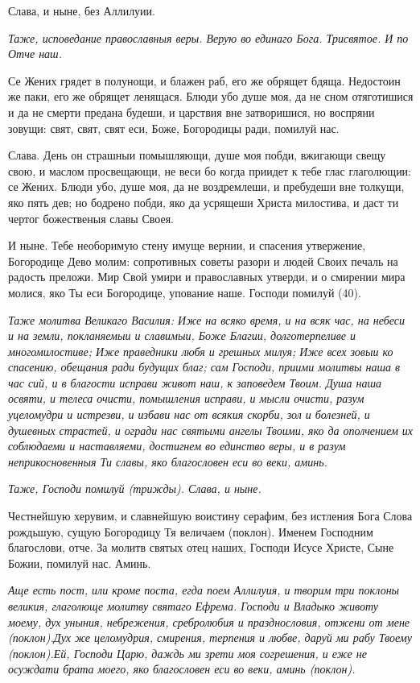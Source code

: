 Слава, и ныне, без Аллилуии. 

\itshape Таже, исповедание православныя веры.\normalfont{} Верую во единаго Бога. Трисвятое. И по Отче наш. 




Се Жених грядет в полунощи, и блажен раб, его же обрящет бдяща. Недостоин же паки, его же обрящет ленящася. Блюди убо душе моя, да не сном отяготишися и да не смерти предана будеши, и царствия вне затворишися, но воспряни зовущи: свят, свят, свят еси, Боже, Богородицы ради, помилуй нас. 

Слава. День он страшныи помышляющи, душе моя побди, вжигающи свещу свою, и маслом просвещающи, не веси бо когда приидет к тебе глас глаголющии: се Жених. Блюди убо, душе моя, да не воздремлеши, и пребудеши вне толкущи, яко пять дев; но бодрено побди, яко да усрящеши Христа милостива, и даст ти чертог божественыя славы Своея. 

И ныне. Тебе необоримую стену имуще вернии, и спасения утвержение, Богородице Дево молим: сопротивных советы разори и людей Своих печаль на радость преложи. Мир Свой умири и православных утверди, и о смирении мира молися, яко Ты еси Богородице, упование наше. Господи помилуй (40). 


\medskip\itshape Таже молитва Великаго Василия:\normalfont{} Иже на всяко время, и на всяк час, на небеси и на земли, покланяемыи и славимыи, Боже Благии, долготерпеливе и многомилостиве; Иже праведники любя и грешных милуя; Иже всех зовыи ко спасению, обещания ради будущих благ; сам Господи, приими молитвы наша в час сий, и в благости исправи живот наш, к заповедем Твоим. Душа наша освяти, и телеса очисти, помышления исправи, и мысли очисти, разум уцеломудри и истрезви, и избави нас от всякия скорби, зол и болезней, и душевных страстей, и огради нас святыми ангелы Твоими, яко да ополчением их соблюдаеми и наставляеми, достигнем во единство веры, и в разум неприкосновенныя Ти славы, яко благословен еси во веки, аминь. 

\itshape Таже, Господи помилуй\normalfont{} (трижды). Слава, и ныне. 

Честнейшую херувим, и славнейшую воистину серафим, без истления Бога Слова рождьшую, сущую Богородицу Тя величаем (поклон). Именем Господним благослови, отче. За молитв святых отец наших, Господи Исусе Христе, Сыне Божии, помилуй нас. Аминь. 

\itshape Аще есть пост, или кроме поста, егда поем Аллилуия, и творим три поклоны великия, глаголюще молитву святаго Ефрема\normalfont{}. Господи и Владыко животу моему, дух уныния, небрежения, сребролюбия и празднословия, отжени от мене (поклон).Дух же целомудрия, смирения, терпения и любве, даруй ми рабу Твоему (поклон).Ей, Господи Царю, даждь ми зрети моя согрешения, и еже не осуждати брата моего, яко благословен еси во веки, аминь (поклон).

